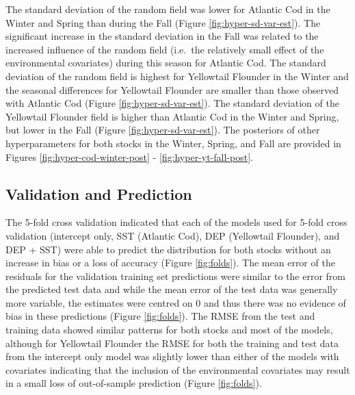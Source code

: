 \documentclass[
]{article}
\begin{document}
The standard deviation of the random field was lower for Atlantic Cod in the Winter and Spring than during the Fall (Figure \ref{fig:hyper-sd-var-est}). The significant increase in the standard deviation in the Fall was related to the increased influence of the random field (i.e.~the relatively small effect of the environmental covariates) during this season for Atlantic Cod. The standard deviation of the random field is highest for Yellowtail Flounder in the Winter and the seasonal differences for Yellowtail Flounder are smaller than those observed with Atlantic Cod (Figure \ref{fig:hyper-sd-var-est}). The standard deviation of the Yellowtail Flounder field is higher than Atlantic Cod in the Winter and Spring, but lower in the Fall (Figure \ref{fig:hyper-sd-var-est}). The posteriors of other hyperparameters for both stocks in the Winter, Spring, and Fall are provided in Figures \ref{fig:hyper-cod-winter-post} - \ref{fig:hyper-yt-fall-post}.

\hypertarget{validation-and-prediction}{%
\subsection{Validation and Prediction}\label{validation-and-prediction}}

The 5-fold cross validation indicated that each of the models used for 5-fold cross validation (intercept only, SST (Atlantic Cod), DEP (Yellowtail Flounder), and DEP + SST) were able to predict the distribution for both stocks without an increase in bias or a loss of accuracy (Figure \ref{fig:folds}). The mean error of the residuals for the validation training set predictions were similar to the error from the predicted test data and while the mean error of the test data was generally more variable, the estimates were centred on 0 and thus there was no evidence of bias in these predictions (Figure \ref{fig:folds}). The RMSE from the test and training data showed similar patterns for both stocks and most of the models, although for Yellowtail Flounder the RMSE for both the training and test data from the intercept only model was slightly lower than either of the models with covariates indicating that the inclusion of the environmental covariates may result in a small loss of out-of-sample prediction (Figure \ref{fig:folds}).
\end{document}
